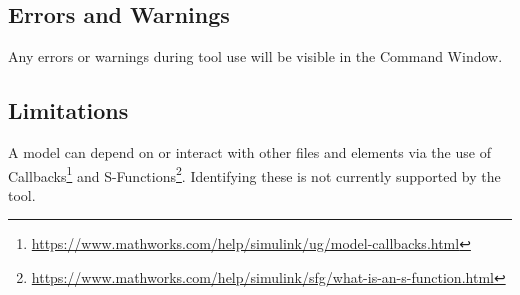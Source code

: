 \documentclass{article}
\begin{document}
%
%


\subsection{Errors and Warnings}
Any errors or warnings during tool use will be visible in the \matlab Command Window. %


\subsection{Limitations}
A \Simulink model can depend on or interact with other files and elements via the use of Callbacks\footnote{\url{https://www.mathworks.com/help/simulink/ug/model-callbacks.html}} and S-Functions\footnote{\url{https://www.mathworks.com/help/simulink/sfg/what-is-an-s-function.html}}. Identifying these is not currently supported by the tool.

\end{document}

